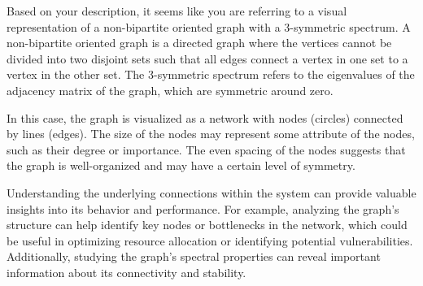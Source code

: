 Based on your description, it seems like you are referring to a visual representation of a non-bipartite oriented graph with a 3-symmetric spectrum. A non-bipartite oriented graph is a directed graph where the vertices cannot be divided into two disjoint sets such that all edges connect a vertex in one set to a vertex in the other set. The 3-symmetric spectrum refers to the eigenvalues of the adjacency matrix of the graph, which are symmetric around zero.

In this case, the graph is visualized as a network with nodes (circles) connected by lines (edges). The size of the nodes may represent some attribute of the nodes, such as their degree or importance. The even spacing of the nodes suggests that the graph is well-organized and may have a certain level of symmetry.

Understanding the underlying connections within the system can provide valuable insights into its behavior and performance. For example, analyzing the graph's structure can help identify key nodes or bottlenecks in the network, which could be useful in optimizing resource allocation or identifying potential vulnerabilities. Additionally, studying the graph's spectral properties can reveal important information about its connectivity and stability.